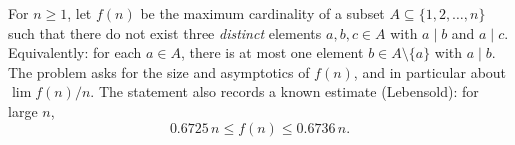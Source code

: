 For $n\ge 1$, let $f(n)$ be the maximum cardinality of a subset $A\subseteq\{1,2,\dots,n\}$ such that there do not exist three \emph{distinct} elements $a,b,c\in A$ with $a\mid b$ and $a\mid c$.
Equivalently: for each $a\in A$, there is at most one element $b\in A\setminus\{a\}$ with $a\mid b$.
The problem asks for the size and asymptotics of $f(n)$, and in particular about $\lim f(n)/n$.
The statement also records a known estimate (Lebensold): for large $n$,
\[
0.6725\,n\le f(n)\le 0.6736\,n.
\]
